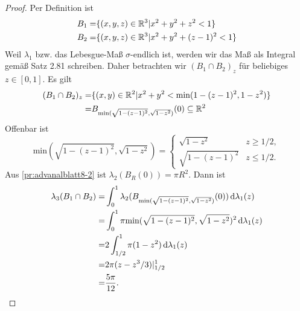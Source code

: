 \begin{proof}
	Per Definition ist
	\begin{align*}
		B_1=&\{(x,y,z)\in \mathbb{R}^3| x^2+y^2+z^2<1\} \\
		B_2=& \{(x,y,z)\in \mathbb{R}^3|x^2+y^2+(z-1)^2<1\} 
	\end{align*}
	Weil $\lambda_1$ bzw. das Lebesgue-Maß $\sigma$-endlich ist, werden wir das Maß als Integral gemäß Satz 2.81 schreiben. Daher betrachten wir $(B_1\cap B_2)_z$ f\"{u}r beliebiges $z\in [0,1]$. Es gilt
	\begin{align*}
		(B_1\cap B_2)_z=&\{(x,y)\in \mathbb{R}^2|x^2+y^2<\text{min}(1-(z-1)^2,1-z^2)\}\\
		=&B_{\text{min}(\sqrt{1-(z-1)^2} ,\sqrt{1-z^2} )}(0) \subseteq \mathbb{R}^2
	\end{align*}
	Offenbar ist 
	\[
		\text{min}(\sqrt{1-(z-1)^2} ,\sqrt{1-z^2} )=\begin{cases}
			\sqrt{1-z^2}  & z \ge 1 / 2,\\
			\sqrt{1-(z-1)^2}  & z \le 1 / 2.
		\end{cases}
	\] 
	Aus \ref{pr:advanalblatt8-2} ist $\lambda_2(B_R(0))=\pi R^2$. Dann ist
	\begin{align*}
		\lambda_3(B_1\cap B_2)=&\int_0^1 \lambda_2(B_{\text{min}(\sqrt{1-(z-1)^2} ,\sqrt{1-z^2} )}(0))\dd{\lambda_{1}(z)}\\
		=&\int_0^1\pi\text{min}(\sqrt{1-(z-1)^2} ,\sqrt{1-z^2} )^2\dd{\lambda_1(z)}\\
		=&2\int_{1 / 2}^{1}\pi (1-z^2) \dd{\lambda_1(z)}\\
		=&2\pi (z-z^3 / 3)|_{1 / 2}^{1}\\
		=&\frac{5\pi}{12}.\qedhere
	\end{align*}
\end{proof}
